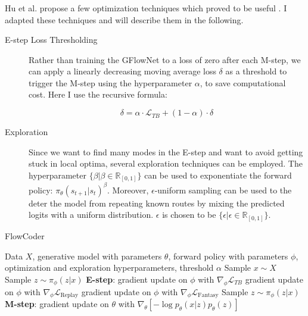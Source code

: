 \subsubsection{}\label{sec:optim}
Hu et al. propose a few optimization techniques which proved to be useful \cite{hu_gflownet-em_2023}. I adapted these techniques and will describe them in the following.
\begin{description}
    \item[E-step Loss Thresholding] Rather than training the GFlowNet to a loss of zero after each M-step, we can apply a linearly decreasing moving average loss $\delta$ as a threshold to trigger the M-step using the hyperparameter $\alpha$, to save computational cost. Here I use the recursive formula:

    \begin{equation}\label{eq:threshold}
        \delta = \alpha \cdot \mathcal{L}_{TB} + (1 - \alpha) \cdot \delta
    \end{equation}
    \item[Exploration] Since we want to find many modes in the E-step and want to avoid getting stuck in local optima, several exploration techniques can be employed.
    The hyperparameter $\{\beta \vert \beta \in \mathbb{R}_{[0, 1]} \}$  can be used to exponentiate the forward policy: $ \pi_\theta(s_{t+1}|s_t)^\beta $.
    Moreover, $\epsilon$-uniform sampling can be used to the deter the model from repeating known routes by mixing the predicted logits with a uniform distribution. $\epsilon$ is chosen to be $\{\epsilon \vert \epsilon \in \mathbb{R}_{[0, 1]} \}$.
\end{description}


\begin{algorithm}[H]
    \caption{FlowCoder}
    \begin{algorithmic}[1]
    \Require Data $X$, generative model with parameters $\theta$, forward policy with parameters $\phi$, optimization and exploration hyperparameters, threshold $\alpha$
    \Repeat
        \State Sample $x \sim X$
        \State Sample $z \sim \pi_\phi(z|x)$
        \State \textbf{E-step}: gradient update on $\phi$ with $\nabla_\phi \mathcal{L}_{TB}$
            \State gradient update on $\phi$ with $\nabla_\phi\mathcal{L}_{\text{Replay}}$
        \EndIf
            \State gradient update on $\phi$ with $\nabla_\phi\mathcal{L}_{\text{Fantasy}}$
        \EndIf
            \State Sample $z \sim \pi_\phi(z|x)$
            \State \textbf{M-step}: gradient update on $\theta$ with $\nabla_\theta[-\log p_\theta(x|z)p_\theta(z)]$
        \EndIf
    \end{algorithmic}
    \label{alg:flowcoder}
    \end{algorithm}






